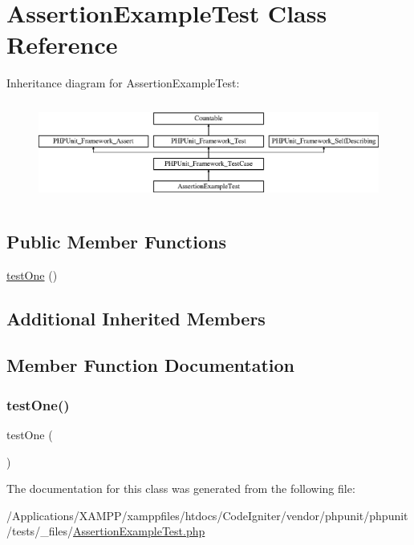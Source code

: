 \hypertarget{class_assertion_example_test}{}\section{Assertion\+Example\+Test Class Reference}
\label{class_assertion_example_test}
Inheritance diagram for Assertion\+Example\+Test\+:\begin{figure}[H]
\begin{center}
\leavevmode
\includegraphics[height=3.303835cm]{class_assertion_example_test}
\end{center}
\end{figure}
\subsection*{Public Member Functions}
\begin{DoxyCompactItemize}
\item 
\mbox{\hyperlink{class_assertion_example_test_afbf3ff88b322c6a7197ce02297cd23a0}{test\+One}} ()
\end{DoxyCompactItemize}
\subsection*{Additional Inherited Members}


\subsection{Member Function Documentation}
\mbox{\label{class_assertion_example_test_afbf3ff88b322c6a7197ce02297cd23a0}} 
\subsubsection{\texorpdfstring{test\+One()}{testOne()}}
{\footnotesize\ttfamily test\+One (\begin{DoxyParamCaption}{ }\end{DoxyParamCaption})}



The documentation for this class was generated from the following file\+:\begin{DoxyCompactItemize}
\item 
/\+Applications/\+X\+A\+M\+P\+P/xamppfiles/htdocs/\+Code\+Igniter/vendor/phpunit/phpunit/tests/\+\_\+files/\mbox{\hyperlink{_assertion_example_test_8php}{Assertion\+Example\+Test.\+php}}\end{DoxyCompactItemize}
